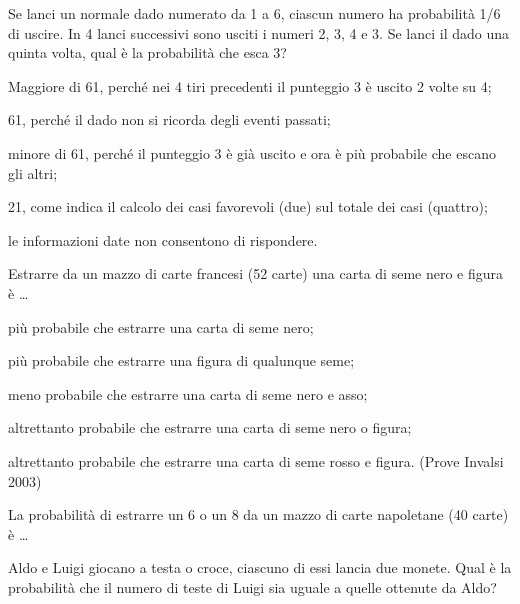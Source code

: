 \begin{esercizio} %
 Se lanci un normale dado numerato da 1 a 6, ciascun numero ha probabilità 1/6 
di uscire. In 4 lanci successivi sono usciti i numeri 2, 3, 4 e 3. Se lanci il 
dado una quinta volta, qual è la probabilità che esca 3?
\begin{itemize*}
\item Maggiore di 61, perché nei 4 tiri precedenti il punteggio 3 è uscito 2 
volte su 4;
\item 61, perché il dado non si ricorda degli eventi passati;
\item minore di 61, perché il punteggio 3 è già uscito e ora è più probabile che 
escano gli altri;
\item 21, come indica il calcolo dei casi favorevoli (due) sul totale dei casi 
(quattro);
\item le informazioni date non consentono di rispondere.
\end{itemize*}
\end{esercizio}

\begin{esercizio} %
 Estrarre da un mazzo di carte francesi (52 carte) una carta di seme nero e 
figura è \ldots
\begin{itemize*}
\item più probabile che estrarre una carta di seme nero;
\item più probabile che estrarre una figura di qualunque seme;
\item meno probabile che estrarre una carta di seme nero e asso;
\item altrettanto probabile che estrarre una carta di seme nero o figura;
\item altrettanto probabile che estrarre una carta di seme rosso e figura. 
(Prove Invalsi 2003)
\end{itemize*}
\end{esercizio}

\begin{esercizio} %
La probabilità di estrarre un 6 o un 8 da un mazzo di carte napoletane (40 
carte) è \ldots
\end{esercizio}

\begin{esercizio} %
Aldo e Luigi giocano a testa o croce, ciascuno di essi lancia due monete. Qual è 
la probabilità che il numero di teste di Luigi sia uguale a quelle ottenute da 
Aldo?
\end{esercizio}

